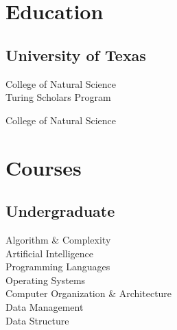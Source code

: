\documentclass[]{deedy-resume-openfont}
\begin{document}
%
%

%
%



%
%

\begin{minipage}[t]{0.33\textwidth} 


\section{Education} 

\subsection{University of Texas}

\vspace{\topsep} %

College of Natural Science \\
Turing Scholars Program \\
\sectionsep

College of Natural Science \\
\sectionsep




\section{Courses}

\subsection{Undergraduate}
Algorithm \& Complexity \\
Artificial Intelligence \\
Programming Languages \\
Operating Systems \\
Computer Organization \& Architecture \\
Data Management \\
Data Structure \\


\end{minipage}
\end{document}
